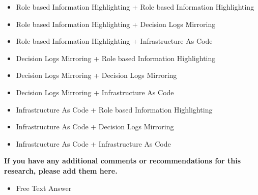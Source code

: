 \begin{itemize}
    \item Role based Information Highlighting + Role based Information Highlighting
    \item Role based Information Highlighting + Decision Logs Mirroring
    \item Role based Information Highlighting + Infrastructure As Code
    
    \item Decision Logs Mirroring + Role based Information Highlighting
    \item Decision Logs Mirroring + Decision Logs Mirroring
    \item Decision Logs Mirroring + Infrastructure As Code

    \item Infrastructure As Code + Role based Information Highlighting
    \item Infrastructure As Code + Decision Logs Mirroring
    \item Infrastructure As Code + Infrastructure As Code
\end{itemize}

\textbf{If you have any additional comments or recommendations for this research, please add them here.}
\begin{itemize}
    \item Free Text Answer
\end{itemize}